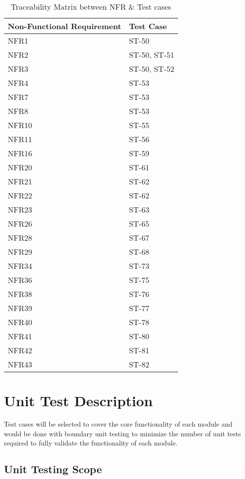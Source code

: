 \documentclass[12pt, titlepage]{article}
\begin{document}
	\newpage
	
	\begin{longtable}{|l|l|}
		\caption{Traceability Matrix between NFR \& Test cases}\\
		\hline
		Non-Functional Requirement &  Test Case\\
		\hline
		NFR1  & ST-50\\
		NFR2  & ST-50, ST-51\\
		NFR3  & ST-50, ST-52\\
		NFR4  & ST-53\\
		NFR7  & ST-53\\
		NFR8  & ST-53\\
		NFR10  & ST-55\\
		NFR11  & ST-56\\
		NFR16  & ST-59\\
		NFR20  & ST-61\\
		NFR21  & ST-62\\
		NFR22  & ST-62\\
		NFR23  & ST-63\\
		NFR26  & ST-65\\
		NFR28  & ST-67\\
		NFR29  & ST-68\\
		NFR34  & ST-73\\
		NFR36  & ST-75\\
		NFR38  & ST-76\\
		NFR39  & ST-77\\
		NFR40  & ST-78\\
		NFR41  & ST-80\\
		NFR42  & ST-81\\
		NFR43  & ST-82\\
		\hline
	\end{longtable}
	
	\newpage
	
	\section{Unit Test Description}
	
	Test cases will be selected to cover the core functionality of each module and would be done with boundary unit testing to minimize the number of unit tests required to fully validate the functionality of each module.
	
	\subsection{Unit Testing Scope}
	
\end{document}
